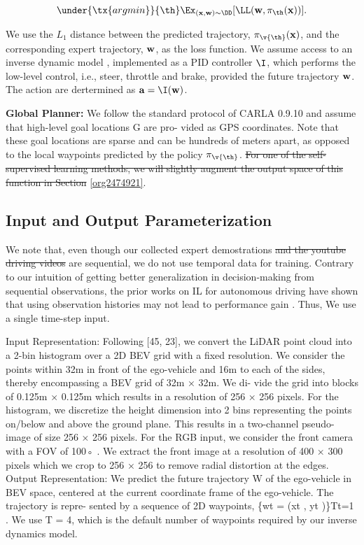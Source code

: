 \documentclass[letterpaper, 12pt]{article}
\theoremstyle{definition}
\theoremstyle{definition}
\theoremstyle{definition}
\theoremstyle{definition}
\theoremstyle{definition}
\begin{document}
\[\under{\tx{argmin }}{{\th}} \Ex_{(\bf x,\bf w)\sim \DD} [\LL(\bf
   w,\pi_{\th}(\bf x))].\]

We use the \(L_{1}\) distance between the predicted trajectory,
\(\pi_{\v{\th}}(\bf x)\), and the corresponding expert trajectory, \(\bf w\),
as the loss function. We assume access to an inverse dynamic model
\cite{10.2307/j.ctt183ph6v}, implemented as a PID controller \(\I\), which
performs the low-level control, i.e., steer, throttle and brake, provided the
future trajectory \(\bf w\). The action are dertermined as \(\bf a=\I(\bf w)\).

\textbf{Global Planner:} We follow the standard protocol of CARLA 0.9.10 and assume that
high-level goal locations G are pro- vided as GPS coordinates. Note that
these goal locations are sparse and can be hundreds of meters apart, as
opposed to the local waypoints predicted by the policy \(\pi_{\v{\th}}\).
\sout{For one of the self-supervised learning methods, we will slightly augment
the output space of this function in Section} \ref{org2474921}.

\subsection{Input and Output Parameterization}
\label{sec:org3a7bba6}
We note that, even though our collected expert demostrations \sout{and the youtube
driving videos} are sequential, we do not use temporal data for
training. Contrary to our intuition of getting better generalization in
decision-making from sequential observations, the prior works on IL for
autonomous driving have shown that using observation histories may not lead to
performance gain \cite{Haan2019,Muller2006,Bansal2018,Wang2019a}. Thus, We use a
single time-step input.


Input Representation: Following [45, 23], we convert the
LiDAR point cloud into a 2-bin histogram over a 2D BEV
grid with a fixed resolution. We consider the points within
32m in front of the ego-vehicle and 16m to each of the sides,
thereby encompassing a BEV grid of 32m × 32m. We di-
vide the grid into blocks of 0.125m × 0.125m which results
in a resolution of 256 × 256 pixels. For the histogram, we
discretize the height dimension into 2 bins representing the
points on/below and above the ground plane. This results in
a two-channel pseudo-image of size 256 × 256 pixels. For
the RGB input, we consider the front camera with a FOV
of 100◦ . We extract the front image at a resolution of 400
× 300 pixels which we crop to 256 × 256 to remove radial
distortion at the edges.
Output Representation: We predict the future trajectory
W of the ego-vehicle in BEV space, centered at the current
coordinate frame of the ego-vehicle. The trajectory is repre-
sented by a sequence of 2D waypoints, \{wt = (xt , yt )\}Tt=1 .
We use T = 4, which is the default number of waypoints
required by our inverse dynamics model.
\end{document}
